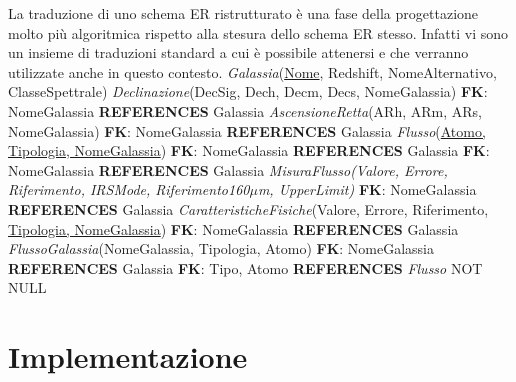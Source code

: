 \documentclass[12pt,a4paper,onecolumn,x11names]{article}
\begin{document}
	\begin{flushleft}
		La traduzione di uno schema ER ristrutturato è una fase della progettazione molto più algoritmica rispetto alla stesura dello schema ER stesso. Infatti vi sono un insieme di traduzioni standard a cui è possibile attenersi e che verranno utilizzate anche in questo contesto.\newline\newline		
		\textsf{\textit{Galassia}(\underline{Nome}, Redshift, NomeAlternativo, ClasseSpettrale)}\newline
		\textsf{\textit{Declinazione}(DecSig, Dech, Decm, Decs, NomeGalassia)}\newline
		\textsf{\textbf{FK}: NomeGalassia \textbf{REFERENCES} Galassia}\newline
		\textsf{\textit{AscensioneRetta}(ARh, ARm, ARs, NomeGalassia)}\newline
		\textsf{\textbf{FK}: NomeGalassia \textbf{REFERENCES} Galassia}\newline
		\textsf{\textit{Flusso}(\underline{Atomo, Tipologia, NomeGalassia})}\newline
		\textsf{\textbf{FK}: NomeGalassia \textbf{REFERENCES} Galassia}\newline
		\textsf{\textbf{FK}: NomeGalassia \textbf{REFERENCES} Galassia}\newline
		\textsf{\textit{MisuraFlusso(Valore, Errore, Riferimento, IRSMode, Riferimento160$\mu$m, UpperLimit)}}\newline
		\textsf{\textbf{FK}: NomeGalassia \textbf{REFERENCES} Galassia}\newline
		\textsf{\textit{CaratteristicheFisiche}(Valore, Errore, Riferimento, \underline{Tipologia, NomeGalassia})}\newline
		\textsf{\textbf{FK}: NomeGalassia \textbf{REFERENCES} Galassia}\newline\newline		
		\textsf{\textit{FlussoGalassia}(NomeGalassia, Tipologia, Atomo)}\newline
		\textsf{\textbf{FK}: NomeGalassia \textbf{REFERENCES} Galassia}\newline
		\textsf{\textbf{FK}: Tipo, Atomo \textbf{REFERENCES} \textit{Flusso} NOT NULL}
	\end{flushleft}


\section{Implementazione}
\end{document}
